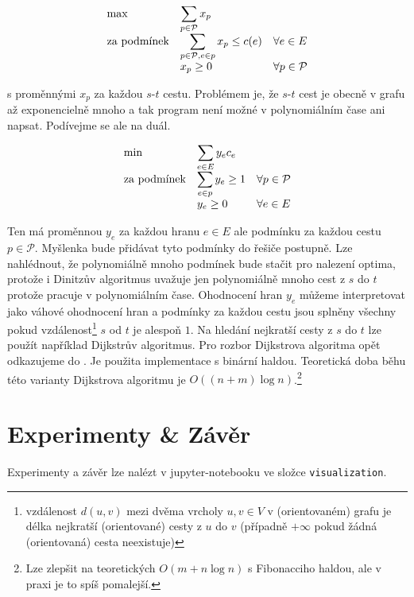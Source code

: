 \documentclass{article}
\theoremstyle{plain}
\theoremstyle{definition}
\begin{document}
\begin{equation}\label{exp_lp}
\begin{array}{ll@{}ll}
\text{max} & \displaystyle\sum_{p\in\mathcal{P}}x_p  &\\
\text{za podmínek}& \displaystyle\sum_{p\in\mathcal{P},e\in p} x_p \leq c(e)  & & \forall e \in E\\
& x_p\geq 0 & & \forall p \in \mathcal{P}
\end{array}
\end{equation}

s proměnnými $x_p$ za každou $s$-$t$ cestu. Problémem je, že $s$-$t$ cest je obecně v grafu až exponencielně mnoho a tak program není možné v polynomiálním čase ani napsat. Podívejme se ale na duál.

\begin{equation}\label{dual_exp}
\begin{array}{ll@{}ll}
\text{min} & \displaystyle\sum_{e\in E}y_ec_e &\\
\text{za podmínek}& \displaystyle \sum_{e\in p}y_e \geq 1 & & \forall p\in\mathcal{P}\\
&y_e \geq 0& & \forall e \in E
\end{array}
\end{equation}

Ten má proměnnou $y_e$ za každou hranu $e\in E$ ale podmínku za každou cestu $p\in \mathcal{P}$. Myšlenka bude přidávat tyto podmínky do řešiče postupně. Lze nahlédnout, že polynomiálně mnoho podmínek bude stačit pro nalezení optima, protože i Dinitzův algoritmus uvažuje jen polynomiálně mnoho cest z $s$ do $t$ protože pracuje v polynomiálním čase. Ohodnocení hran $y_e$ můžeme interpretovat jako váhové ohodnocení hran a podmínky za každou cestu jsou splněny všechny pokud vzdálenost\footnote{vzdálenost $d(u,v)$ mezi dvěma vrcholy $u,v\in V$ v (orientovaném) grafu je délka nejkratší (orientované) cesty z $u$ do $v$ (případně $+\infty$ pokud žádná (orientovaná) cesta neexistuje)} $s$ od $t$ je alespoň $1$. Na hledání nejkratší cesty z $s$ do $t$ lze použít například Dijkstrův algoritmus. Pro rozbor Dijkstrova algoritma opět odkazujeme do \cite{labyrint}. Je použita implementace s binární haldou. Teoretická doba běhu této varianty Dijkstrova algoritmu je $O((n+m)\log n)$.\footnote{Lze zlepšit na teoretických $O(m+n\log n)$ s Fibonacciho haldou, ale v praxi je to spíš pomalejší.}

\section{Experimenty \& Závěr}
Experimenty a závěr lze nalézt v jupyter-notebooku ve složce {\tt visualization}.



\end{document}
